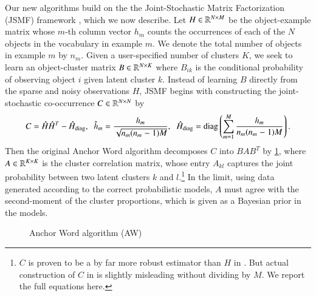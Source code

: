 Our new algorithms build on the the Joint\hyp{}Stochastic Matrix Factorization 
(JSMF) framework \cite{moontae2015nips}, which we now describe. Let $H \in
\mathbb{R}^{N \mathbin{\times} M}$ be the object\hyp{}example matrix whose $m$\hyp{}th column
vector $h_m$ counts the occurrences of each of the $N$ objects in the vocabulary
in example $m$. We denote the total number of objects in example $m$ by $n_m$.
Given a user-specified number of clusters $K$, we seek to learn an
object\hyp{}cluster matrix $B \in \mathbb{R}^{N \mathbin{\times} K}$ where $B_{ik}$ is the
conditional probability of observing object $i$ given latent cluster $k$.
Instead of learning $B$ directly from the sparse and noisy observations $H$,
JSMF begins with constructing the joint-stochastic co-occurrence $C \in \mathbb{R}^
{N \mathbin{\times} N}$ by
\begin{equation}
	C = \hat{H} \hat{H}^T - \hat{H}_{\operatorname{diag}}, \;\; \hat{h}_m \mathrel{=} \frac{h_m}{\sqrt{n_m
	(n_m \mathrel{-} 1)M}}, \;\; \hat{H}_{\operatorname{diag}} \mathrel{=} \operatorname{diag} \left( \sum_{m=1}^M \frac{h_m}
	{n_m(n_m \mathrel{-} 1)M} \right).
	\label{eqn:unbiased}
\end{equation}
Then the original Anchor Word algorithm decomposes $C$ into $B A B^T$ by
\cref{alg:awa}, where $A \in \mathbb{R}^{K \mathbin{\times} K}$ is the cluster correlation
matrix, whose entry $A_{kl}$ captures the joint probability between two latent
clusters $k$ and $l$.\footnote{$C$ is proven to be a by far more robust
estimator than $H$ in \cite{AGM}.  But actual construction of $C$ in 
\cite{arora2013practical} is slightly misleading without dividing by $M$. We
report the full equations here.} In the limit, using data generated
according to the correct probabilistic models, $A$ must agree with the
second\hyp{}moment of the cluster proportions, which is given as a Bayesian
prior in the models.

\begin{figure}[ht]
	\begin{algorithm}[H]
		\DontPrintSemicolon
		\caption{Anchor Word algorithm (AW)}
	\label{alg:awa}        
	\end{algorithm}
\end{figure}

